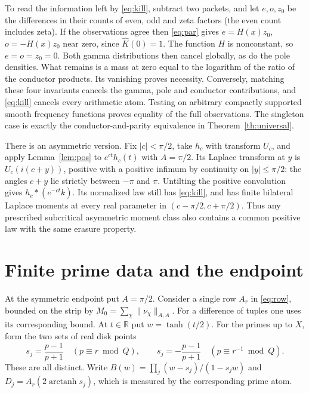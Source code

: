 \documentclass[11pt]{article}
\newcommand{\RR}{\mathbb R}
\begin{document}
To read the information left by \eqref{eq:kill}, subtract two packets, and let \(e,o,z_0\) be the differences in their counts of even, odd and zeta factors (the even count includes zeta). If the observations agree then \eqref{eq:par} gives \(e=H(x)z_0\), \(o=-H(x)z_0\) near zero, since \(\widehat K(0)=1\).
The function \(H\) is nonconstant, so \(e=o=z_0=0\).
Both gamma distributions then cancel globally, as do the pole densities. What remains is a mass at zero equal to the logarithm of the ratio of the conductor products. Its vanishing proves necessity. Conversely, matching these four invariants cancels the gamma, pole and conductor contributions, and \eqref{eq:kill} cancels every arithmetic atom. Testing on arbitrary compactly supported smooth frequency functions proves equality of the full observations. The singleton case is exactly the conductor-and-parity equivalence in Theorem~\ref{th:universal}.

There is an asymmetric version. Fix \(|c|<\pi/2\), take \(h_c\) with transform \(U_c\), and apply Lemma~\ref{lem:pos} to \(e^{ct}h_c(t)\) with \(A=\pi/2\). Its Laplace transform at \(y\) is \(U_c(i(c+y))\), positive with a positive infimum by continuity on \(|y|\le\pi/2\): the angles \(c+y\) lie strictly between \(-\pi\) and \(\pi\). Untilting the positive convolution gives \(h_c*(e^{-ct}k)\). Its normalized law still has \eqref{eq:kill}, and has finite bilateral Laplace moments at every real parameter in \((c-\pi/2,c+\pi/2)\). Thus any prescribed subcritical asymmetric moment class also contains a common positive law with the same erasure property.

\section{Finite prime data and the endpoint}\label{sec:finite}
At the symmetric endpoint put \(A=\pi/2\). Consider a single row \(A_r\) in \eqref{eq:row}, bounded on the strip by \(M_0=\sum_\chi\|\nu_\chi\|_{A,A}\). For a difference of tuples one uses its corresponding bound. At \(t\in\RR\) put \(w=\tanh(t/2)\). For the primes up to \(X\), form the two sets of real disk points
\[
 s_j=\frac{p-1}{p+1}\quad(p\equiv r\bmod Q),\qquad
 s_j=-\frac{p-1}{p+1}\quad(p\equiv r^{-1}\bmod Q).
\]
These are all distinct. Write \(B(w)=\prod_j(w-s_j)/(1-s_jw)\) and \(D_j=A_r(2\operatorname{arctanh}s_j)\), which is measured by the corresponding prime atom.
\end{document}
